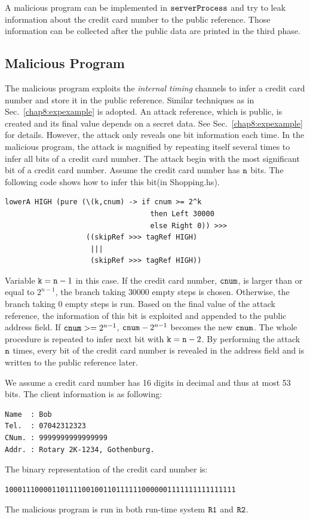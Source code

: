 \documentclass{report}
\newcommand{\co}[1]{$\cod{#1}$}
\begin{document}
A malicious program can be implemented in \co{serverProcess} and try to leak information about the credit card 
number to the public reference. Those information can be collected after the public data are printed in the 
third phase. 

\subsection{Malicious Program}
The malicious program exploits the {\em internal timing} channels to infer a credit card number and store it
in the public reference. Similar techniques as in Sec.~\ref{chap8:expexample} is adopted. 
An attack reference, which is public, is created and its final value depends on a secret data.
See Sec.~\ref{chap8:expexample} for details.
However, the attack only reveals one bit information each time. In the malicious program, the attack
is magnified by repeating itself several times to infer all bits of a credit card number. 
The attack begin with the most significant bit of a credit card number. Assume the credit card number has
\co{n} bits. The following code shows how to infer this bit(in Shopping.hs).
\begin{Verbatim}[fontsize=\small]
lowerA HIGH (pure (\(k,cnum) -> if cnum >= 2^k 
                                  then Left 30000 
                                  else Right 0)) >>>
                   ((skipRef >>> tagRef HIGH)
                    |||
                    (skipRef >>> tagRef HIGH))
\end{Verbatim}
Variable $\mathtt{k} =\mathtt{n} -1$ in this case. If the credit card number, \co{cnum}, is larger than or equal to $2^{n-1}$, 
the branch taking $30000$ empty steps is chosen. Otherwise, the branch taking $0$ empty steps is run.  
Based on the final value of the attack reference, the information of this 
bit is exploited and appended to the public address field. 
If $\mathtt{cnum} >=2^{n-1}$, $\mathtt{cnum} -2^{n-1}$ becomes the new \co{cnum}. The whole procedure
is repeated to infer next bit with $\mathtt{k} =\mathtt{n} -2$.
By performing the attack \co{n} times, every bit of the credit card number is revealed in the address field and 
is written to the public reference later.

We assume a credit card number has 16 digits in decimal and thus at most 53 bits. 
The client information is as following:
\begin{Verbatim}[fontsize=\small]
Name  : Bob
Tel.  : 07042312323
CNum. : 9999999999999999
Addr. : Rotary 2K-1234, Gothenburg.
\end{Verbatim}
The binary representation of the credit card number is:
\begin{Verbatim}[fontsize=\small]
100011100001101111001001101111110000001111111111111111
\end{Verbatim}
The malicious program is run in both run-time system \co{R1} and \co{R2}. 
\end{document}
